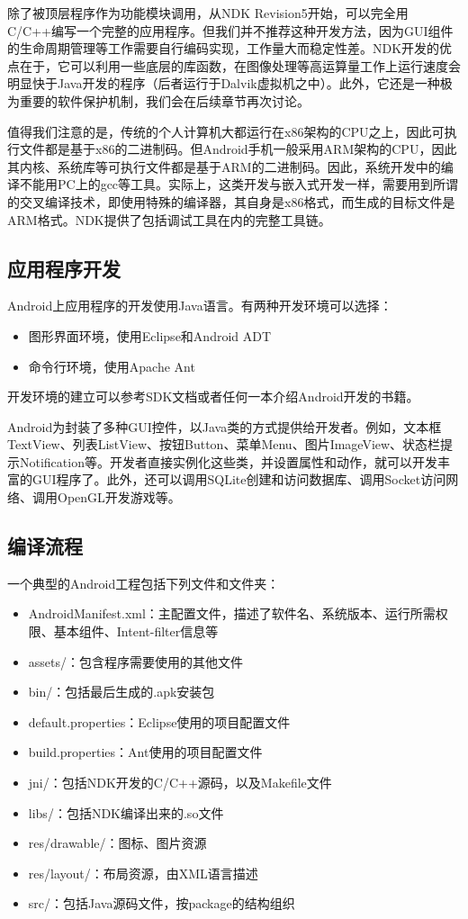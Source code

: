 除了被顶层程序作为功能模块调用，从NDK Revision5开始，可以完全用C/C++编写一个完整的应用程序。但我们并不推荐这种开发方法，因为GUI组件的生命周期管理等工作需要自行编码实现，工作量大而稳定性差。NDK开发的优点在于，它可以利用一些底层的库函数，在图像处理等高运算量工作上运行速度会明显快于Java开发的程序（后者运行于Dalvik虚拟机之中）。此外，它还是一种极为重要的软件保护机制，我们会在后续章节再次讨论。

值得我们注意的是，传统的个人计算机大都运行在x86架构的CPU之上，因此可执行文件都是基于x86的二进制码。但Android手机一般采用ARM架构的CPU，因此其内核、系统库等可执行文件都是基于ARM的二进制码。因此，系统开发中的编译不能用PC上的gcc等工具。实际上，这类开发与嵌入式开发一样，需要用到所谓的交叉编译技术，即使用特殊的编译器，其自身是x86格式，而生成的目标文件是ARM格式。NDK提供了包括调试工具在内的完整工具链。

\subsection{应用程序开发}
Android上应用程序的开发使用Java语言。有两种开发环境可以选择：
\begin{itemize}
	\item 图形界面环境，使用Eclipse和Android ADT
	\item 命令行环境，使用Apache Ant
\end{itemize}
开发环境的建立可以参考SDK文档或者任何一本介绍Android开发的书籍。

Android为封装了多种GUI控件，以Java类的方式提供给开发者。例如，文本框TextView、列表ListView、按钮Button、菜单Menu、图片ImageView、状态栏提示Notification等。开发者直接实例化这些类，并设置属性和动作，就可以开发丰富的GUI程序了。此外，还可以调用SQLite创建和访问数据库、调用Socket访问网络、调用OpenGL开发游戏等。

\subsection{编译流程}
一个典型的Android工程包括下列文件和文件夹：
\begin{itemize}
	\item AndroidManifest.xml：主配置文件，描述了软件名、系统版本、运行所需权限、基本组件、Intent-filter信息等
	\item assets/：包含程序需要使用的其他文件
	\item bin/：包括最后生成的.apk安装包
	\item default.properties：Eclipse使用的项目配置文件
	\item build.properties：Ant使用的项目配置文件
	\item jni/：包括NDK开发的C/C++源码，以及Makefile文件
	\item libs/：包括NDK编译出来的.so文件
	\item res/drawable/：图标、图片资源
	\item res/layout/：布局资源，由XML语言描述
	\item src/：包括Java源码文件，按package的结构组织
\end{itemize}

